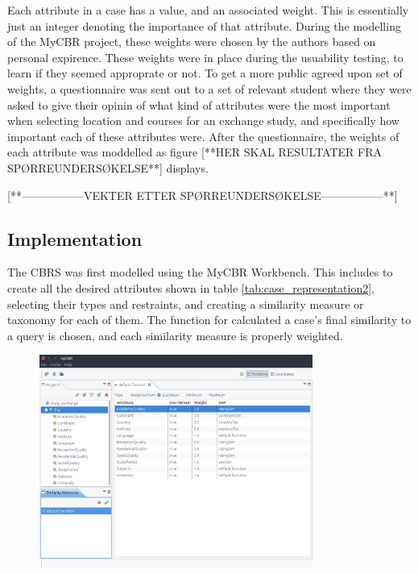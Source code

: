 Each attribute in a case has a value, and an associated weight. This is essentially just an integer denoting the importance of that attribute. During the modelling of the MyCBR project, these weights were chosen by the authors based on personal expirence. These weights were in place during the usuability testing, to learn if they seemed approprate or not. To get a more public agreed upon set of weights, a questionnaire was sent out to a set of relevant student where they were asked to give their opinin of what kind of attributes were the most important when selecting location and courses for an exchange study, and specifically how important each of these attributes were. After the questionnaire, the weights of each attribute was moddelled as figure [**HER SKAL RESULTATER FRA SPØRREUNDERSØKELSE**] displays.

[**-----------------VEKTER ETTER SPØRREUNDERSØKELSE-----------------**]

\subsection{Implementation}

The CBRS was first modelled using the MyCBR Workbench. This includes to create all the desired attributes shown in table \ref{tab:case_representation2}, selecting their types and restraints, and creating a similarity measure or taxonomy for each of them. The function for calculated a case's final similarity to a query is chosen, and each similarity measure is properly weighted.

\begin{figure}[H]
    \centering
    \includegraphics[width=0.8\textwidth]{fig/cbr_model.png}
\end{figure}

